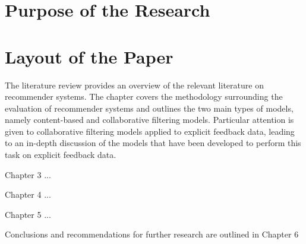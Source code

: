 \section{Purpose of the Research}


\section{Layout of the Paper}
The literature review provides an overview of the relevant literature on recommender systems. The chapter covers the methodology surrounding the evaluation of recommender systems and outlines the two main types of models, namely content-based and collaborative filtering models. Particular attention is given to collaborative filtering models applied to explicit feedback data, leading to an in-depth discussion of the models that have been developed to perform this task on explicit feedback data.

Chapter 3 ...

Chapter 4 ...

Chapter 5 ...

Conclusions and recommendations for further research are outlined in Chapter 6


 